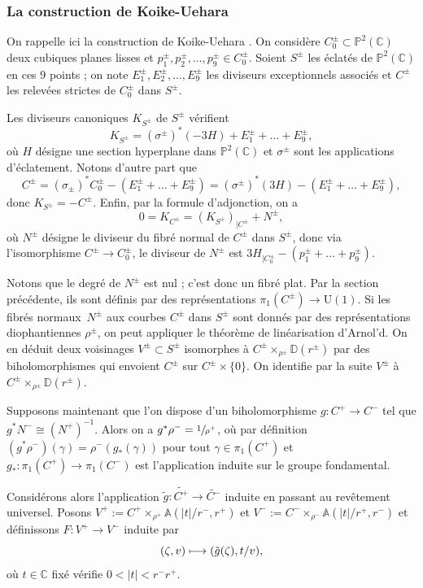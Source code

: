\documentclass[JEP,XML,SOM,Unicode,francais,published]{cedram}
\newcommand\mto{\mathchoice{\longmapsto}{\mapsto}{\mapsto}{\mapsto}}
\newcommand{\C}{\mathbb{C}}
\newcommand{\rU}{\mathrm{U}}
\theoremstyle{definition}
\begin{document}
\subsubsection*{La construction de Koike-Uehara} On rappelle ici la construction de Koike-Uehara \cite[\S\,2]{koike2019gluing}.
On considère $C_0^{\pm} \subset \mathbb{P}^2(\C)$ deux cubiques planes lisses et $p_1^{\pm}, p_2^{\pm}, \ldots, p_9^{\pm} \in C_0^\pm$. Soient $S^{\pm}$ les éclatés de $\mathbb{P}^2(\C)$ en ces $9$ points ; on note $E_1^{\pm}, E_2^{\pm}, \ldots, E_9^{\pm}$ les diviseurs exceptionnels associés et $C^{\pm}$ les relevées strictes de $C_0^{\pm}$ dans $S^{\pm}$.

Les diviseurs canoniques $K_{S^{\pm}}$ de $S^{\pm}$ vérifient
\[
K_{S^{\pm}} = (\sigma^{\pm})^{*}(-3H) + E_1^\pm + \ldots + E_9^\pm,
\]
où $H$ désigne une section hyperplane dans $\mathbb{P}^2(\C)$ et $\sigma^{\pm}$ sont les applications d'éclatement. Notons d'autre part que
\[
C^{\pm} = \left(\sigma_{\pm}\right)^{*}C_0^{\pm} - (E_1^{\pm} + \ldots + E_9^{\pm}) = (\sigma^{\pm})^{*}(3H)-(E_1^{\pm} + \ldots + E_9^{\pm}),
\]
donc $K_{S^{\pm}} = -C^{\pm}$. Enfin, par la formule d'adjonction, on a
\[
0 = K_{C^{\pm}} = (K_{S^\pm})_{|C^{\pm}} + N^{\pm},
\]
où $N^{\pm}$ désigne le diviseur du fibré normal de $C^{\pm}$ dans $S^{\pm}$, donc via l'isomorphisme $C^{\pm} \to C_0^{\pm}$, le diviseur de $N^{\pm}$ est $3H_{|C_0^{\pm}}- (p_1^{\pm} + \ldots + p_9^{\pm})$.

Notons que le degré de $N^{\pm}$ est nul ; c'est donc un fibré plat. Par la section précédente, ils sont définis par des représentations $\pi_1(C^\pm) \to \rU(1)$.
Si les fibrés normaux~$N^{\pm}$ aux courbes $C^\pm$ dans $S^\pm$ sont donnés par des représentations diophantiennes $\rho^\pm$, on peut appliquer le théorème de linéarisation d'Arnol'd. On en déduit deux voisinages $V^\pm \subset S^\pm$ isomorphes à $C^\pm\times_{\rho^\pm} \mathbb{D}(r^\pm)$ par des biholomorphismes qui envoient $C^\pm$ sur $C^{\pm} \times \{0\}$. On identifie par la suite $V^\pm$ à $C^\pm\times_{\rho^\pm} \mathbb{D}(r^\pm)$.

Supposons maintenant que l'on dispose d'un biholomorphisme $g \colon C^{+} \to C^{-}$ tel que $g^{*}N^{-} \cong (N^{+})^{-1}$. Alors on a $g^*\rho^{-} = \sfrac{1}{\rho^{+}}$, où par définition $(g^{*}\rho^{-})(\gamma) = \rho^{-}(g_{*}(\gamma))$ pour tout $\gamma \in \pi_1(C^+)$ et $g_* \colon \pi_1(C^+) \to \pi_1(C^-)$ est l'application induite sur le groupe fondamental.

Considérons alors l'application $\tilde{g} \colon \tilde{C^+} \to \tilde{C^-}$ induite en passant au revêtement universel. Posons $V^+:= C^+\times_{\rho^+} \mathbb{A}(|t|/r^-, r^+)$ et $V^-:= C^-\times_{\rho^-} \mathbb{A}(|t|/r^+, r^-)$ et définissons $F \colon V^+ \to V^-$ induite par\[
(\zeta, v) \mto (\tilde{g}(\zeta), t/v),\]où $t\in\C$ fixé vérifie $0 < |t| < r^{-}r^{+}$.
\end{document}
